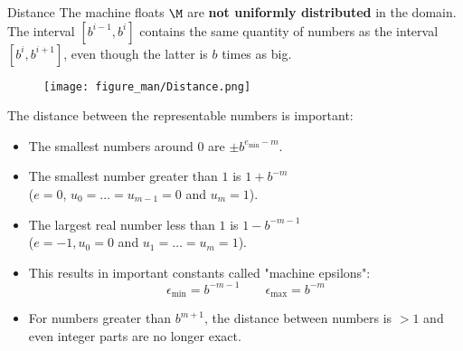 \documentclass[11pt,compress,t,notes=noshow, xcolor=table]{beamer}
\begin{document}





\begin{vbframe}{Distance}
The machine floats $\M$ are \textbf{not
uniformly distributed} in the domain. The interval $[b^{i-1},b^i]$ contains the same quantity of numbers as the interval $[b^i,b^{i+1}]$, even though
the latter is $b$ times as big.

\begin{center}
\begin{figure}
  \texttt{[image: figure\_man/Distance.png]}
\end{figure}
\end{center}



\framebreak

The distance between the representable numbers is important:
\begin{itemize}
 \item The smallest numbers around $0$ are $\pm b^{e_{\min}-m}$. \\[2mm]
 \item The smallest number greater than $1$ is $1+b^{-m}$ \\
 ($e = 0$, $u_0 = \hdots = u_{m-1} = 0$ and $u_m = 1$). \\[2mm]
 \item The largest real number less than $1$ is $1-b^{-m-1}$ \\
 ($e = -1, u_0 = 0$ and $u_1 = \hdots = u_m = 1$). \\[2mm]
 \item This results in important constants called
  "machine epsilons":
  $$
    \label{eq:2}
    \epsilon_{\min} = b^{-m-1} \qquad %
    \epsilon_{\max} = b^{-m}
  $$
 \item For numbers greater than $b^{m + 1}$, the distance between numbers is $> 1$ and even integer parts
   are no longer exact.


\end{itemize}
\end{vbframe}
\end{document}
